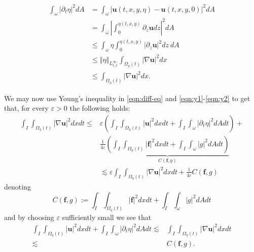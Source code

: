 \documentclass[10pt,a4paper]{article}
\numberwithin{equation}{section}
\begin{document}
\begin{equation}\label{eqn:y2}
\begin{aligned}\int_{\omega}\left|\partial_{t}\eta\right|^{2}dA & =\int_{\omega}\left|\mathbf{u}\left(t,x,y,\eta\right)-\mathbf{u}\left(t,x,y,0\right)\right|^{2}dA\\
 & =\int_{\omega}\left|\int_{0}^{\eta\left(t,x,y\right)}\partial_{z}\mathbf{u}dz\right|^{2}dA\\
 & \le\int_{\omega}\eta\int_{0}^{\eta\left(t,x,y\right)}\left|\partial_{z}\mathbf{u}\right|^{2}dz\ dA\\
 & \le\left\Vert \eta\right\Vert _{L_{t,x}^{\infty}}\int_{\Omega_{\eta}\left(t\right)}\left|\nabla\mathbf{u}\right|^{2}dx\\
 & \le\int_{\Omega_{\eta}\left(t\right)}\left|\nabla\mathbf{u}\right|^{2}dx.
\end{aligned}
\end{equation}

We may now use Young's inequality in \eqref{eqn:diff-eq} and \eqref{eqn:y1}-\eqref{eqn:y2} to get that, for every $\varepsilon>0$ the following holds:
\begin{equation}
    \begin{aligned}\int_{I}\int_{\Omega_{\eta}\left(t\right)}\left|\nabla\mathbf{u}\right|^{2}dxdt\le & \varepsilon\left(\int_{I}\int_{\Omega_{\eta}\left(t\right)}\left|\mathbf{u}\right|^{2}dxdt+\int_{I}\int_{\omega}\left|\partial_{t}\eta\right|^{2}dAdt\right)+\\
 & \frac{1}{4\varepsilon}\underbrace{\left(\int_{I}\int_{\Omega_{\eta}\left(t\right)}\left|\mathbf{f}\right|^{2}dxdt+\int_{I}\int_{\omega}\left|g\right|^{2}dAdt\right)}_{C\left(\mathbf{f},g\right)}\\
 & \lesssim\varepsilon\int_{I}\int_{\Omega_{\eta}\left(t\right)}\left|\nabla\mathbf{u}\right|^{2}dxdt+\frac{1}{4\varepsilon}C\left(\mathbf{f},g\right)
\end{aligned}
\end{equation}
denoting
\begin{equation}\label{eqn:C(f,g)}
C\left(\mathbf{f},g\right):=\int_{I}\int_{\Omega_{\eta}\left(t\right)}\left|\mathbf{f}\right|^{2}dxdt+\int_{I}\int_{\omega}\left|g\right|^{2}dAdt
\end{equation}
and by choosing $\varepsilon$ sufficiently small we see that 
\begin{equation}\label{eqn:diffusion-estimate}
\begin{aligned}\int_{I}\int_{\Omega_{\eta}\left(t\right)}\left|\mathbf{u}\right|^{2}dxdt+\int_{I}\int_{\omega}\left|\partial_{t}\eta\right|^{2}dAdt\lesssim & \int_{I}\int_{\Omega_{\eta}\left(t\right)}\left|\nabla\mathbf{u}\right|^{2}dxdt\\
\lesssim & C\left(\mathbf{f},g\right).
\end{aligned}
\end{equation}
\end{document}
